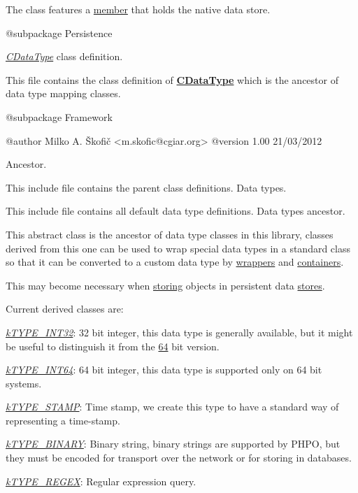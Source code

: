 The class features a \hyperlink{}{member} that holds the native data store.

\begin{DoxyVerb}    @subpackage     Persistence\end{DoxyVerb}


{\itshape \hyperlink{class_c_data_type}{C\-Data\-Type}} class definition.

This file contains the class definition of {\bfseries \hyperlink{class_c_data_type}{C\-Data\-Type}} which is the ancestor of data type mapping classes.

\begin{DoxyVerb}    @subpackage     Framework

    @author         Milko A. Škofič <m.skofic@cgiar.org>
    @version        1.00 21/03/2012\end{DoxyVerb}


Ancestor.

This include file contains the parent class definitions. Data types.

This include file contains all default data type definitions. Data types ancestor.

This abstract class is the ancestor of data type classes in this library, classes derived from this one can be used to wrap special data types in a standard class so that it can be converted to a custom data type by \hyperlink{class_c_data_wrapper}{wrappers} and \hyperlink{class_c_container}{containers}.

This may become necessary when \hyperlink{class_c_persistent_object_a88b1f2b11d3d60e0b3d33d8b0649b68a}{storing} objects in persistent data \hyperlink{class_c_data_wrapper}{stores}.

Current derived classes are\-:


\begin{DoxyItemize}
\item {\itshape \hyperlink{}{k\-T\-Y\-P\-E\-\_\-\-I\-N\-T32}}\-: 32 bit integer, this data type is generally available, but it might be useful to distinguish it from the \hyperlink{}{64} bit version. 
\item {\itshape \hyperlink{}{k\-T\-Y\-P\-E\-\_\-\-I\-N\-T64}}\-: 64 bit integer, this data type is supported only on 64 bit systems. 
\item {\itshape \hyperlink{}{k\-T\-Y\-P\-E\-\_\-\-S\-T\-A\-M\-P}}\-: Time stamp, we create this type to have a standard way of representing a time-\/stamp. 
\item {\itshape \hyperlink{}{k\-T\-Y\-P\-E\-\_\-\-B\-I\-N\-A\-R\-Y}}\-: Binary string, binary strings are supported by P\-H\-P\-O, but they must be encoded for transport over the network or for storing in databases. 
\item {\itshape \hyperlink{}{k\-T\-Y\-P\-E\-\_\-\-R\-E\-G\-E\-X}}\-: Regular expression query. 
\end{DoxyItemize}

